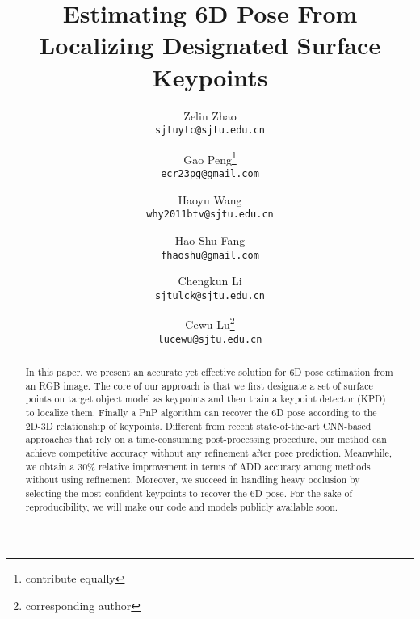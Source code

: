 \documentclass[10pt,twocolumn,letterpaper]{article}
\makeatletter
\newcommand{\printfnsymbol}[1]{\textsuperscript{\@fnsymbol{#1}}}
\makeatother
\begin{document}
\title{Estimating 6D Pose From Localizing Designated Surface Keypoints}

\author{Zelin Zhao\\
{\tt\small sjtuytc@sjtu.edu.cn}
\and
Gao Peng\thanks{contribute equally}\\
{\tt\small ecr23pg@gmail.com}
\and
Haoyu Wang\printfnsymbol{1}\\
{\tt\small why2011btv@sjtu.edu.cn}
\and
Hao-Shu Fang\\
{\tt\small fhaoshu@gmail.com}
\and
Chengkun Li\\
{\tt\small sjtulck@sjtu.edu.cn}
\and
Cewu Lu\thanks{corresponding author} \\
{\tt\small lucewu@sjtu.edu.cn}
}

\maketitle
\newcommand{\cewu}[1]{\textcolor{red}{$_{cewu}$[#1]}}
\newcommand{\haoshu}[1]{\textcolor{red}{$_{haoshu}$[#1]}}
\newcommand{\haoyu}[1]{\textcolor{red}{$_{haoyu}$[#1]
}}

\begin{abstract}
In this paper, we present an accurate yet effective solution for 6D pose estimation from an RGB image. The core of our approach is that we first designate a set of surface points on target object model as keypoints and then train a keypoint detector (KPD) to localize them. Finally a PnP algorithm can recover the 6D pose according to the 2D-3D relationship of keypoints. Different from recent state-of-the-art CNN-based approaches \cite{Kehl2017SSD6DMR, Rad2017BB8AS} that rely on a time-consuming post-processing procedure, our method can achieve competitive accuracy without any refinement after pose prediction. Meanwhile, we obtain a 30\% relative improvement in terms of ADD accuracy \cite{Hinterstoisser:2012:MBT:2481913.2481959} among methods without using refinement. Moreover, we succeed in handling heavy occlusion by selecting the most confident keypoints to recover the 6D pose. For the sake of reproducibility, we will make our code and models publicly available soon.
\end{abstract}
\end{document}
